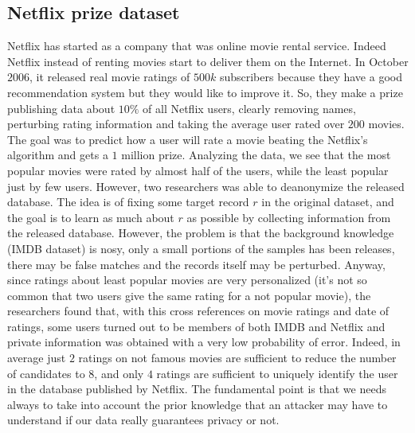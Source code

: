 \subsection{Netflix prize dataset}
Netflix has started as a company that was online movie rental service. Indeed Netflix instead of renting movies start to deliver them on the Internet. In October $2006$, it released real movie ratings of $500k$ subscribers because they have a good recommendation system but they would like to improve it. So, they make a prize publishing data about $10 \%$ of all Netflix users, clearly removing names, perturbing rating information and taking the average user rated over $200$ movies. The goal was to predict how a user will rate a movie beating the Netflix's algorithm and gets a $1$ million prize. Analyzing the data, we see that the most popular movies were rated by almost half of the users, while the least popular just by few users. However, two researchers was able to deanonymize the released database. The idea is of fixing some target record $r$ in the original dataset, and the goal is to learn as much about $r$ as possible by collecting information from the released database. However, the problem is that the background knowledge (IMDB dataset) is nosy, only a small portions of the samples has been releases, there may be false matches and the records itself may be perturbed. Anyway, since ratings about least popular movies are very personalized (it's not so common that two users give the same rating for a not popular movie), the researchers found that, with this cross references on movie ratings and date of ratings, some users turned out to be members of both IMDB and Netflix and private information was obtained with a very low probability of error. Indeed, in average just $2$ ratings on not famous movies are sufficient to reduce the number of candidates to $8$, and only $4$ ratings are sufficient to uniquely identify the user in the database published by Netflix. The fundamental point is that we needs always to take into account the prior knowledge that an attacker may have to understand if our data really guarantees privacy or not.


